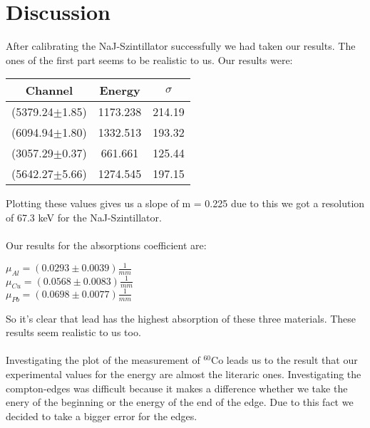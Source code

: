 \newpage
\section{Discussion}
After calibrating the NaJ-Szintillator successfully we had taken our results. The ones of the first part seems to be realistic to us. Our results were:
\begin{center}
\begin{tabular}{c|c|c}
Channel & Energy & $\sigma$\\
\hline
(5379.24$\pm$1.85)& 1173.238 & 214.19\\
(6094.94$\pm$1.80) & 1332.513 &  193.32\\	
(3057.29$\pm$0.37) & 661.661 & 125.44\\
(5642.27$\pm$5.66) & 1274.545 & 197.15\\
\end{tabular}
\end{center}

Plotting these values gives us a slope of m = 0.225 due to this we got a resolution of 67.3 keV for the NaJ-Szintillator.\\
\\
Our results for the absorptions coefficient are:\\
\begin{center}
$\mu_{Al} = (0.0293 \pm 0.0039)\frac{1}{mm}$\\
$\mu_{Cu} = (0.0568 \pm 0.0083)\frac{1}{mm}$\\
$\mu_{Pb} = (0.0698 \pm 0.0077)\frac{1}{mm}$\\
\end{center}

So it's clear that lead has the highest absorption of these three materials. These results seem realistic to us too.\\
\\
Investigating the plot of the measurement of $^{60}$Co leads us to the result that our experimental values for the energy are almost the literaric ones. Investigating the compton-edges was difficult because it makes a difference whether we take the enery of the beginning or the energy of the end of the edge. Due to this fact we decided to take a bigger error for the edges.